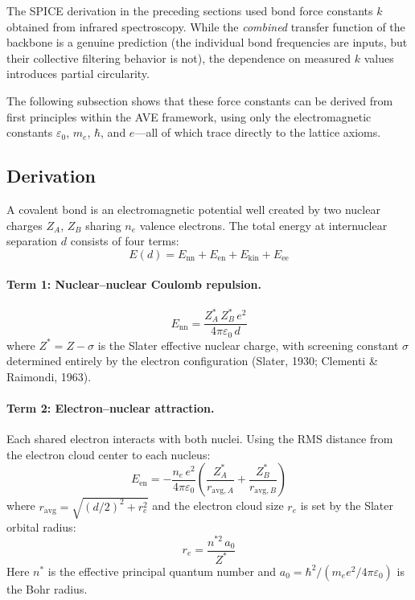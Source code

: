 The SPICE derivation in the preceding sections used bond force constants $k$ obtained from infrared spectroscopy. While the \emph{combined} transfer function of the backbone is a genuine prediction (the individual bond frequencies are inputs, but their collective filtering behavior is not), the dependence on measured $k$ values introduces partial circularity.

The following subsection shows that these force constants can be derived from first principles within the AVE framework, using only the electromagnetic constants $\varepsilon_0$, $m_e$, $\hbar$, and $e$---all of which trace directly to the lattice axioms.

\subsection{Derivation}

A covalent bond is an electromagnetic potential well created by two nuclear charges $Z_A$, $Z_B$ sharing $n_e$ valence electrons. The total energy at internuclear separation $d$ consists of four terms:
\begin{equation}
    E(d) = E_\text{nn} + E_\text{en} + E_\text{kin} + E_\text{ee}
    \label{eq:bond_energy}
\end{equation}

\paragraph{Term 1: Nuclear--nuclear Coulomb repulsion.}
\begin{equation}
    E_\text{nn} = \frac{Z^*_A \, Z^*_B \, e^2}{4\pi\varepsilon_0 \, d}
\end{equation}
where $Z^* = Z - \sigma$ is the Slater effective nuclear charge, with screening constant $\sigma$ determined entirely by the electron configuration (Slater, 1930; Clementi \& Raimondi, 1963).

\paragraph{Term 2: Electron--nuclear attraction.}
Each shared electron interacts with both nuclei. Using the RMS distance from the electron cloud center to each nucleus:
\begin{equation}
    E_\text{en} = -\frac{n_e \, e^2}{4\pi\varepsilon_0} \left( \frac{Z^*_A}{r_{\text{avg},A}} + \frac{Z^*_B}{r_{\text{avg},B}} \right)
\end{equation}
where $r_{\text{avg}} = \sqrt{(d/2)^2 + r_e^2}$ and the electron cloud size $r_e$ is set by the Slater orbital radius:
\begin{equation}
    r_e = \frac{n^{*2} \, a_0}{Z^*}
    \label{eq:slater_radius}
\end{equation}
Here $n^*$ is the effective principal quantum number and $a_0 = \hbar^2/(m_e e^2/4\pi\varepsilon_0)$ is the Bohr radius.

